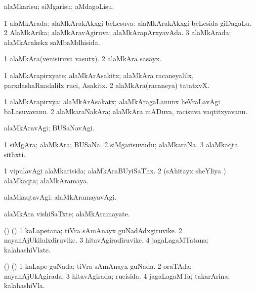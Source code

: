 \bentry
{}
\gl{\sakirx}
\bmng
alaMkarisu; siMgarisu; aMdagoLisu. 
\emng
\eentry

\bentry
{}
\gl{\gu}
\bmng
\bnum
\num{1} alaMkArada; alaMkArakAkxgi beLesuva:  alaMkArakAkxgi beLesida giDagaLu. 
\num{2} AlaMkArika; alaMkAravAgiruva; alaMkArapArxyavAda. 
\num{3} alaMkArada; alaMkArakekx saMbaMdhisida. 
\enum
\emng
\eentry

\bentry
{}
\gl{\nA}
\bmng
\bnum
\num{1} alaMkAra(venisiruva vasutx). 
\num{2} alaMkAra sasayx. 
\enum
\emng
\eentry

\bentry
{}
\gl{\nA}
\bmng
\bnum
\num{1} alaMkArapirxyate; alaMkArAsakitx; alaMkAra racaneyalilx, parxdashaRnadalilx ruci, Asakitx. 
\num{2} alaMkAra(racaneya) tatatxvX. 
\enum
\emng
\eentry

\bentry
{}
\gl{\nA}
\bmng
\bnum
\num{1} alaMkArapirxya; alaMkArAsakatx; alaMkAragaLanunx heVraLavAgi baLasuvavanu. 
\num{2} alaMkaraNakAra; alaMkAra mADuva, racisuva vaqtitxyavanu. 
\enum
\emng
\eentry

\bentry
{}
\gl{\kirxvi}
\bmng
alaMkAravAgi; BUSaNavAgi. 
\emng
\eentry

\bentry
{}
\gl{\nA}
\bmng
\bnum
\num{1} siMgAra; alaMkAra; BUSaNa. 
\num{2} siMgarisuvudu; alaMkaraNa. 
\num{3} alaMkaqta sithxti. 
\enum
\emng
\eentry

\bentry
{}
\gl{\gu}
\bmng
\bnum
\num{1} vipulavAgi alaMkarisida; alaMkAraBUyiSaThx. 
\num{2} (sAhitayx sheYliya \vi) alaMkaqta; alaMkAramaya. 
\enum
\emng
\eentry

\bentry
{}
\gl{\kirxvi}
\bmng
alaMkaqtavAgi; alaMkAramayavAgi. 
\emng
\eentry

\bentry
{}
\gl{\nA}
\bmng
alaMkAra vishiSaTxte; alaMkAramayate. 
\emng
\eentry

\bentry
{}
\gl{\nA}
\bmng
(\ame) (\AmA) 
\bnum
\num{1} kaLapetana; tiVra sAmAnayx guNadAdxgiruvike. 
\num{2} nayanAjUkilalxdiruvike. 
\num{3} hitavAgiradiruvike. 
\num{4} jagaLagaMTatana; kalahashiVlate. 
\enum
\emng
\eentry

\bentry
{}
\gl{\gu}
\bmng
(\ame) (\AmA) 
\bnum
\num{1} kaLape guNada; tiVra sAmAnayx guNada. 
\num{2} oraTAda; nayanAjUkAgirada. 
\num{3} hitavAgirada; rucisida. 
\num{4} jagaLagaMTa; takarArina; kalahashiVla. 
\enum
\emng
\eentry

